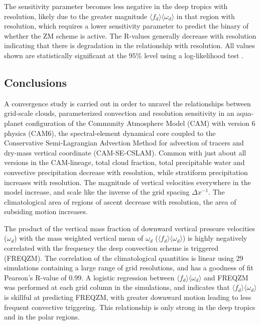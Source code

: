 The sensitivity parameter becomes less negative in the deep tropics with resolution, likely due to the greater magnitude $\langle f_{d} \rangle \langle \omega_{d} \rangle$ in that region with resolution, which requires a lower sensitivity parameter to predict the binary of whether the ZM scheme is active. The R-values generally decrease with resolution indicating that there is degradation in the relationship with resolution. All values shown are statistically significant at the $95\%$ level using a log-likelihood test \citep{WILKSBOOK}.
 
\subsection{Conclusions}

A convergence study is carried out in order to unravel the relationships between grid-scale clouds, parameterized convection and resolution sensitivity in an aqua-planet configuration of the Community Atmosphere Model (CAM) with version 6 physics (CAM6), the spectral-element dynamical core coupled to the Conservative Semi-Lagrangian Advection Method for advection of tracers and dry-mass vertical coordinate (CAM-SE-CSLAM). Common with just about all versions in the CAM-lineage, total cloud fraction, total precipitable water and convective precipitation decrease with resolution, while stratiform precipitation increases with resolution. The magnitude of vertical velocities everywhere in the model increase, and scale like the inverse of the grid spacing $\Delta x^{-1}$. The climatological area of regions of ascent decrease with resolution, the area of subsiding motion increases.

 The product of the vertical mass fraction of downward vertical pressure velocities ($\omega_d$) with the mass weighted vertical mean of $\omega_d$ ($\langle f_{d} \rangle \langle \omega_{d} \rangle$) is highly negatively correlated with the frequency the \cite{ZM1995AO} deep convection scheme is triggered (FREQZM). The correlation of the climatological quantities is linear using 29 simulations containing a large range of grid resolutions, and has a goodness of fit Pearson's R-value of 0.99. A logistic regression between $\langle f_{d} \rangle \langle \omega_{d} \rangle$ and FREQZM was performed at each grid column in the simulations, and indicates that $\langle f_{d} \rangle \langle \omega_{d} \rangle$ is skillful at predicting FREQZM, with greater downward motion leading to less frequent convective triggering. This relationship is only strong in the deep tropics and in the polar regions.
 
